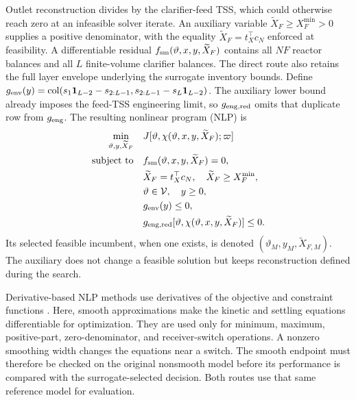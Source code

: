 \documentclass[a4paper,fleqn]{cas-sc}
\newcommand{\col}{\operatorname{col}}
\begin{document}
Outlet reconstruction divides by the clarifier-feed TSS, which could otherwise reach zero at an infeasible solver iterate. An auxiliary variable $\widetilde X_F\ge X_F^{\min}>0$ supplies a positive denominator, with the equality $\widetilde X_F=t_X^\top c_N$ enforced at feasibility. A differentiable residual $f_{\rm sm}(\vartheta,x,y,\widetilde X_F)$ contains all $NF$ reactor balances and all $L$ finite-volume clarifier balances. The direct route also retains the full layer envelope underlying the surrogate inventory bounds. Define $g_{\rm env}(y)=\col(s_1\mathbf1_{L-2}-s_{2:L-1},s_{2:L-1}-s_L\mathbf1_{L-2})$. The auxiliary lower bound already imposes the feed-TSS engineering limit, so $g_{\rm eng,red}$ omits that duplicate row from $g_{\rm eng}$. The resulting nonlinear program (NLP) is
\begin{equation}
\begin{aligned}
\min_{\vartheta,y,\widetilde X_F}\quad&J[\vartheta,\chi(\vartheta,x,y,\widetilde X_F);\varpi]\\
\text{subject to}\quad& f_{\rm sm}(\vartheta,x,y,\widetilde X_F)=0,\\
&\widetilde X_F=t_X^\top c_N,\quad \widetilde X_F\ge X_F^{\min},\\
&\vartheta\in\mathcal V,\quad y\ge0,\\
&g_{\rm env}(y)\le0,\\
&g_{\rm eng,red}[\vartheta,\chi(\vartheta,x,y,\widetilde X_F)]\le0.
\end{aligned}
\label{eq:mechanisticnlp}
\end{equation}
Its selected feasible incumbent, when one exists, is denoted $(\vartheta_M,y_M,\widetilde X_{F,M})$. The auxiliary does not change a feasible solution but keeps reconstruction defined during the search.

Derivative-based NLP methods use derivatives of the objective and constraint functions \citep{BuzziFerraris2013}. Here, smooth approximations make the kinetic and settling equations differentiable for optimization. They are used only for minimum, maximum, positive-part, zero-denominator, and receiver-switch operations. A nonzero smoothing width changes the equations near a switch. The smooth endpoint must therefore be checked on the original nonsmooth model before its performance is compared with the surrogate-selected decision. Both routes use that same reference model for evaluation.
\end{document}

